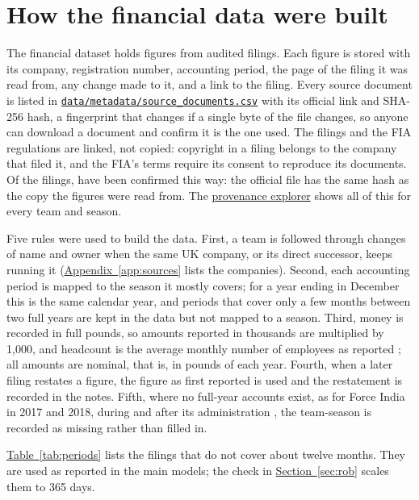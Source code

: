 \documentclass[11pt,a4paper]{article}
\newcommand{\site}{https://nahianibnat-2000.github.io/F1-moneyball}
\newcommand{\repo}{https://github.com/NahianIbnat-2000/F1-moneyball}
\newcommand{\sitepage}[2]{\href{\site/#1}{#2}}
\newcommand{\code}[1]{\href{\repo/blob/main/#1}{\nolinkurl{#1}}}
\begin{document}
\FloatBarrier
\section{How the financial data were built}
\label{app:construction}

\noindent The financial dataset holds \NFinFigures{} figures from \NFilings{} audited filings. Each figure is stored with its
company, registration number, accounting period, the page of the filing it was read from, any change made to it, and a link
to the filing. Every source document is listed in \code{data/metadata/source_documents.csv} with its official link and
SHA-256 hash, a fingerprint that changes if a single byte of the file changes, so anyone can download a document and confirm
it is the one used. The filings and the FIA regulations are linked, not copied: copyright in a filing belongs to the
company that filed it, and the FIA's terms require its consent to reproduce its documents. Of the \NDocCH{} filings,
\NDocVerified{} have been confirmed this way: the official file has the same hash as the copy the figures were read from.
\DocUnverified The \sitepage{provenance}{provenance explorer} shows all of this for every team
and season.

Five rules were used to build the data. First, a team is followed through changes of name and owner
when the same UK company, or its direct successor, keeps running it (\hyperref[app:sources]{Appendix~\ref*{app:sources}}
lists the companies). Second, each accounting period is mapped to the season it mostly covers; for a year ending in
December this is the same calendar year, and periods that cover only a few months between two full years are kept in the
data but not mapped to a season. Third, money is recorded in full pounds, so amounts reported in thousands are multiplied by
1,000, and headcount is the average monthly number of employees as reported \citep[s.~411(3)]{companiesact2006}; all
amounts are nominal, that is, in pounds of each year. Fourth, when a later filing restates a figure, the figure as first
reported is used and the restatement is recorded in the notes. Fifth, where no full-year accounts exist, as for Force India
in 2017 and 2018, during and after its administration \citep{ch_forceindia}, the team-season is recorded as missing rather
than filled in.

\hyperref[tab:periods]{Table~\ref*{tab:periods}} lists the filings that do not cover about twelve months. They are used
as reported in the main models; the check in \hyperref[sec:rob]{Section~\ref*{sec:rob}} scales them to 365 days.
\end{document}
